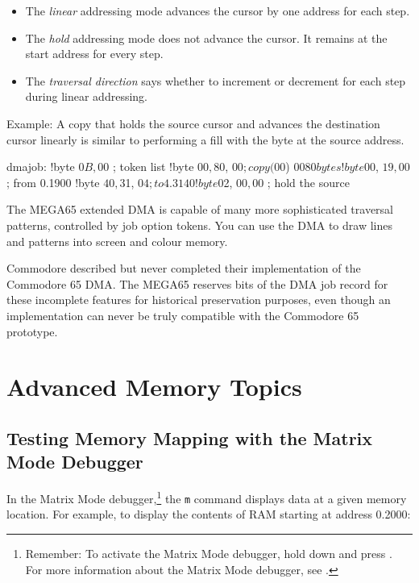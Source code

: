 \begin{itemize}
\item The {\em linear} addressing mode advances the cursor by one address for each step.
\item The {\em hold} addressing mode does not advance the cursor. It remains at the start address for every step.
\item The {\em traversal direction} says whether to increment or decrement for each step during linear addressing.
\end{itemize}

Example: A copy that holds the source cursor and advances the destination cursor linearly is similar to performing a fill with the byte at the source address.

\begin{asmcode}
dmajob:
!byte $0B, $00       ; token list
!byte $00, $80, $00  ; copy ($00) $0080 bytes
!byte $00, $19, $00  ; from 0.1900
!byte $40, $31, $04  ; to 4.3140
!byte $02, $00, $00  ; hold the source
\end{asmcode}

The MEGA65 extended DMA is capable of many more sophisticated traversal patterns, controlled by job option tokens. You can use the DMA to draw lines and patterns into screen and colour memory.

Commodore described but never completed their implementation of the Commodore 65 DMA. The MEGA65 reserves bits of the DMA job record for these incomplete features for historical preservation purposes, even though an implementation can never be truly compatible with the Commodore 65 prototype.


\newpage
\section{Advanced Memory Topics}

\subsection{Testing Memory Mapping with the Matrix Mode Debugger}

In the Matrix Mode debugger,\footnote{Remember: To activate the Matrix Mode debugger, hold down \megasymbolkey and press . For more information about the Matrix Mode debugger, see .} the \texttt{m} command displays data at a given memory location. For example, to display the contents of RAM starting at address 0.2000:

